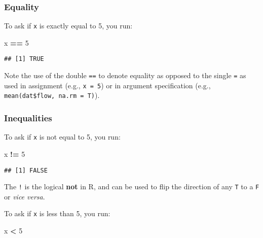 \documentclass[]{book}
\newenvironment{Shaded}{\begin{snugshade}}{\end{snugshade}}
\newcommand{\DecValTok}[1]{\textcolor[rgb]{0.00,0.00,0.81}{#1}}
\newcommand{\NormalTok}[1]{#1}
\newcommand{\OperatorTok}[1]{\textcolor[rgb]{0.81,0.36,0.00}{\textbf{#1}}}
\newcommand{\StringTok}[1]{\textcolor[rgb]{0.31,0.60,0.02}{#1}}
\begin{document}
\hypertarget{equality}{%
\subsubsection*{Equality}\label{equality}}

To ask if \texttt{x} is exactly equal to 5, you run:

\begin{Shaded}
\begin{Highlighting}[]
\NormalTok{x }\OperatorTok{==}\StringTok{ }\DecValTok{5}
\end{Highlighting}
\end{Shaded}

\begin{verbatim}
## [1] TRUE
\end{verbatim}

Note the use of the double \texttt{==} to denote equality as opposed to the single \texttt{=} as used in assignment (e.g., \texttt{x\ =\ 5}) or in argument specification (e.g., \texttt{mean(dat\$flow,\ na.rm\ =\ T)}).

\hypertarget{inequalities}{%
\subsubsection*{Inequalities}\label{inequalities}}

To ask if \texttt{x} is not equal to 5, you run:

\begin{Shaded}
\begin{Highlighting}[]
\NormalTok{x }\OperatorTok{!=}\StringTok{ }\DecValTok{5}
\end{Highlighting}
\end{Shaded}

\begin{verbatim}
## [1] FALSE
\end{verbatim}

The \texttt{!} is the logical \textbf{not} in R, and can be used to flip the direction of any \texttt{T} to a \texttt{F} or \emph{vice versa}.

To ask if \texttt{x} is less than 5, you run:

\begin{Shaded}
\begin{Highlighting}[]
\NormalTok{x }\OperatorTok{<}\StringTok{ }\DecValTok{5}
\end{Highlighting}
\end{Shaded}
\end{document}
